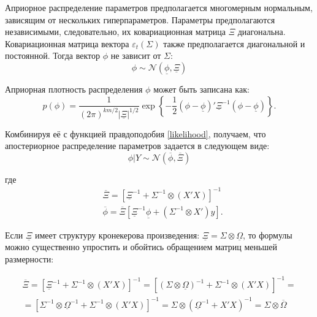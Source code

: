 \documentclass[11pt]{article} %
\newcommand{\cN}{\mathcal{N}}
\newcommand{\prior}{\underline}
\newcommand{\post}{\overline}
\begin{document}


Априорное распределение параметров предполагается многомерным нормальным, зависящим от нескольких гиперпараметров. Параметры предполагаются независимыми, следовательно, их ковариационная матрица $\Xi$ диагональна. Ковариационная матрица вектора $\varepsilon_t (\Sigma)$  также предполагается диагональной и постоянной.
Тогда вектор $\phi$ не зависит от $\Sigma$:
\begin{equation}
\phi\sim \cN(\prior \phi, \prior \Xi)
\end{equation}

Априорная плотность распределения $\phi$  может быть записана как:
\begin{equation}
p(\phi)=\frac{1}{(2\pi)^{km/2}|\prior\Xi|^{1/2}} \exp \left\lbrace-\frac{1}{2}(\phi-\prior \phi)'\prior\Xi^{-1}(\phi-\prior \phi ) \right\rbrace.
\end{equation}

Комбинируя её с функцией правдоподобия \eqref{likelihood}, получаем, что апостериорное распределение параметров задается в следующем виде:
\begin{equation}
\phi|Y\sim \cN(\post{\phi},\post \Xi)
\end{equation}

где
\begin{align*}
&\post \Xi=[\prior \Xi^{-1}+\Sigma^{-1}\otimes(X'X)]^{-1}\\
& \post \phi=\post{\Xi}[\prior \Xi^{-1}\prior \phi+(\Sigma^{-1}\otimes X')y].
\end{align*}

Если $\prior\Xi$ имеет структуру кронекерова произведения: $\prior\Xi = \Sigma \otimes \prior{\Omega}$, то формулы можно существенно упростить и обойтись обращением матриц меньшей размерности:

\begin{multline}
\post \Xi=[\prior \Xi^{-1}+\Sigma^{-1}\otimes(X'X)]^{-1}=[(\Sigma \otimes \prior\Omega)^{-1}+\Sigma^{-1}\otimes(X'X)]^{-1}=\\
=[\Sigma^{-1}\otimes  \prior\Omega^{-1} +\Sigma^{-1}\otimes(X'X)]^{-1}=\Sigma \otimes (\prior\Omega^{-1}+ X'X)^{-1} = \Sigma \otimes \post \Omega
\end{multline}
\end{document}

